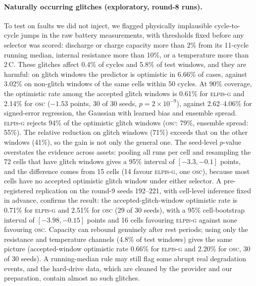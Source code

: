 \documentclass{esannV2}
\newcommand{\OSC}{\textsc{osc}}
\newcommand{\AUTOD}{\textsc{elpis-g}}
\begin{document}
\paragraph{Naturally occurring glitches (exploratory, round-8 runs).} To test on faults we did not inject, we flagged physically implausible cycle-to-cycle jumps in the raw battery measurements, with thresholds fixed before any selector was scored: discharge or charge capacity more than 2\% from its 11-cycle running median, internal resistance more than 10\%, or a temperature more than 2\,\textdegree C. These glitches affect 0.4\% of cycles and 5.8\% of test windows, and they are harmful: on glitch windows the predictor is optimistic in 6.66\% of cases, against 3.02\% on non-glitch windows of the same cells within 50 cycles. At 90\% coverage, the optimistic rate among the accepted glitch windows is 0.61\% for \AUTOD{} and 2.14\% for \OSC{} ($-1.53$ points, 30 of 30 seeds, $p=2\times10^{-9}$), against 2.62--4.06\% for signed-error regression, the Gaussian with learned bias and ensemble spread. \AUTOD{} rejects 94\% of the optimistic glitch windows (\OSC{}: 79\%, ensemble spread: 55\%). The relative reduction on glitch windows (71\%) exceeds that on the other windows (41\%), so the gain is not only the general one. The seed-level $p$-value overstates the evidence across assets: pooling all runs per cell and resampling the 72 cells that have glitch windows gives a 95\% interval of $[-3.3,-0.1]$ points, and the difference comes from 15 cells (14 favour \AUTOD, one \OSC), because most cells have no accepted optimistic glitch window under either selector. A pre-registered replication on the round-9 seeds 192--221, with cell-level inference fixed in advance, confirms the result: the accepted-glitch-window optimistic rate is 0.71\% for \AUTOD{} and 2.51\% for \OSC{} (29 of 30 seeds), with a 95\% cell-bootstrap interval of $[-3.98,-0.15]$ points and 16 cells favouring \AUTOD{} against none favouring \OSC. Capacity can rebound genuinely after rest periods; using only the resistance and temperature channels (4.8\% of test windows) gives the same picture (accepted-window optimistic rate 0.66\% for \AUTOD{} and 2.20\% for \OSC, 30 of 30 seeds). A running-median rule may still flag some abrupt real degradation events, and the hard-drive data, which are cleaned by the provider and our preparation, contain almost no such glitches.
\end{document}

